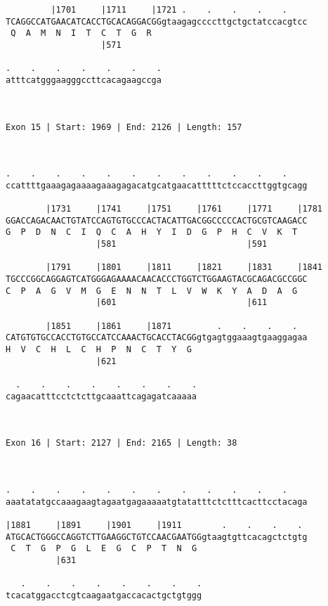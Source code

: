 \documentclass{article}
\begin{document}
{\begin{Verbatim}
         |1701     |1711     |1721 .    .    .    .    .    
TCAGGCCATGAACATCACCTGCACAGGACGGgtaagagccccttgctgctatccacgtcc
 Q  A  M  N  I  T  C  T  G  R                               
                   |571                                     
  
.    .    .    .    .    .    .
atttcatgggaagggccttcacagaagccga
                               
                               
 
Exon 15 | Start: 1969 | End: 2126 | Length: 157



.    .    .    .    .    .    .    .    .    .    .    .    
ccattttgaaagagaaaagaaagagacatgcatgaacatttttctccaccttggtgcagg
                                                            
        |1731     |1741     |1751     |1761     |1771     |1781
GGACCAGACAACTGTATCCAGTGTGCCCACTACATTGACGGCCCCCACTGCGTCAAGACC
G  P  D  N  C  I  Q  C  A  H  Y  I  D  G  P  H  C  V  K  T  
                  |581                          |591        
  
        |1791     |1801     |1811     |1821     |1831     |1841
TGCCCGGCAGGAGTCATGGGAGAAAACAACACCCTGGTCTGGAAGTACGCAGACGCCGGC
C  P  A  G  V  M  G  E  N  N  T  L  V  W  K  Y  A  D  A  G  
                  |601                          |611        
  
        |1851     |1861     |1871         .    .    .    .  
CATGTGTGCCACCTGTGCCATCCAAACTGCACCTACGGgtgagtggaaagtgaaggagaa
H  V  C  H  L  C  H  P  N  C  T  Y  G                       
                  |621                                      
  
  .    .    .    .    .    .    .    .
cagaacatttcctctcttgcaaattcagagatcaaaaa
                                      
                                      
 
Exon 16 | Start: 2127 | End: 2165 | Length: 38



.    .    .    .    .    .    .    .    .    .    .    .    
aaatatatgccaaagaagtagaatgagaaaaatgtatatttctctttcacttcctacaga
                                                            
|1881     |1891     |1901     |1911        .    .    .    . 
ATGCACTGGGCCAGGTCTTGAAGGCTGTCCAACGAATGGgtaagtgttcacagctctgtg
 C  T  G  P  G  L  E  G  C  P  T  N  G                      
          |631                                              
  
   .    .    .    .    .    .    .    .
tcacatggacctcgtcaagaatgaccacactgctgtggg
                                       

\end{Verbatim}}
\end{document}
